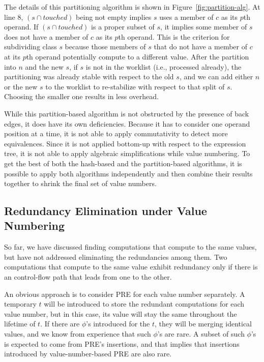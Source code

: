 The details of this partitioning algorithm is shown in
Figure~\ref{fig:partition-alg}.  At line 8, $(s \cap touched)$ being
not empty implies $s$ uses a member of $c$ as its $p$th operand.  If
$(s \cap touched)$ is a proper subset of $s$, it implies some member of $s$ 
does not have a member
of $c$ as its $p$th operand.  This is the criterion for subdividing
class $s$ because those members of $s$ that do not have a member of $c$ at
its $p$th operand potentially compute to a different value.  
After the partition into $n$ and the new $s$,
if $s$ is not in the worklist (i.e., processed already), the 
partitioning was already stable with respect to the old $s$, and
we can add either $n$ or the new $s$ to the worklist to re-stabilize with
respect to that split of $s$.  Choosing the smaller one results in less
overhead.

While this partition-based algorithm is not obstructed by the presence of
back edges, it does have its own deficiencies.  Because it has to consider
one operand position at a time, it is not able to apply commutativity to
detect more equivalences.  Since it is not applied bottom-up with respect to
the expression tree, it is not able to apply algebraic simplifications
while value numbering.
To get the best of both the hash-based and the partition-based algorithms,
it is possible to apply both algorithms independently and then combine their
results together to shrink the final set of value numbers.

\subsection{Redundancy Elimination under Value Numbering}

So far, we have discussed finding computations that compute to the
same values, but have not addressed eliminating the redundancies
among them.  Two computations that compute to the same value exhibit redundancy 
only if there is an control-flow path that leads from one to the other.

An obvious approach is to consider PRE for each value
number separately.  A temporary $t$ will be introduced to store the redundant
computations for each value number, but in this case, its value will stay the 
same throughout the lifetime of $t$.  If there are $\phi$'s introduced for
the $t$, they will be merging identical values, and we know from
experience that such $\phi$'s are rare.  A subset of such $\phi$'s is expected 
to come from PRE's insertions, and that implies that insertions
introduced by value-number-based PRE are also rare.

